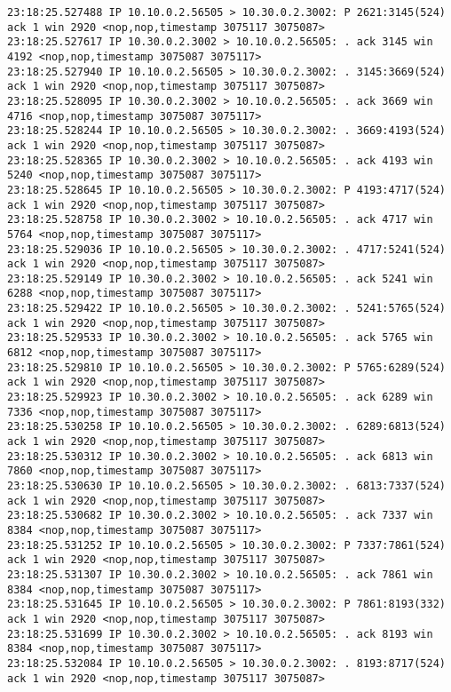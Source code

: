 \documentclass[a4paper,12pt]{article}
\begin{document}
\begin{Verbatim}
23:18:25.527488 IP 10.10.0.2.56505 > 10.30.0.2.3002: P 2621:3145(524) ack 1 win 2920 <nop,nop,timestamp 3075117 3075087>
23:18:25.527617 IP 10.30.0.2.3002 > 10.10.0.2.56505: . ack 3145 win 4192 <nop,nop,timestamp 3075087 3075117>
23:18:25.527940 IP 10.10.0.2.56505 > 10.30.0.2.3002: . 3145:3669(524) ack 1 win 2920 <nop,nop,timestamp 3075117 3075087>
23:18:25.528095 IP 10.30.0.2.3002 > 10.10.0.2.56505: . ack 3669 win 4716 <nop,nop,timestamp 3075087 3075117>
23:18:25.528244 IP 10.10.0.2.56505 > 10.30.0.2.3002: . 3669:4193(524) ack 1 win 2920 <nop,nop,timestamp 3075117 3075087>
23:18:25.528365 IP 10.30.0.2.3002 > 10.10.0.2.56505: . ack 4193 win 5240 <nop,nop,timestamp 3075087 3075117>
23:18:25.528645 IP 10.10.0.2.56505 > 10.30.0.2.3002: P 4193:4717(524) ack 1 win 2920 <nop,nop,timestamp 3075117 3075087>
23:18:25.528758 IP 10.30.0.2.3002 > 10.10.0.2.56505: . ack 4717 win 5764 <nop,nop,timestamp 3075087 3075117>
23:18:25.529036 IP 10.10.0.2.56505 > 10.30.0.2.3002: . 4717:5241(524) ack 1 win 2920 <nop,nop,timestamp 3075117 3075087>
23:18:25.529149 IP 10.30.0.2.3002 > 10.10.0.2.56505: . ack 5241 win 6288 <nop,nop,timestamp 3075087 3075117>
23:18:25.529422 IP 10.10.0.2.56505 > 10.30.0.2.3002: . 5241:5765(524) ack 1 win 2920 <nop,nop,timestamp 3075117 3075087>
23:18:25.529533 IP 10.30.0.2.3002 > 10.10.0.2.56505: . ack 5765 win 6812 <nop,nop,timestamp 3075087 3075117>
23:18:25.529810 IP 10.10.0.2.56505 > 10.30.0.2.3002: P 5765:6289(524) ack 1 win 2920 <nop,nop,timestamp 3075117 3075087>
23:18:25.529923 IP 10.30.0.2.3002 > 10.10.0.2.56505: . ack 6289 win 7336 <nop,nop,timestamp 3075087 3075117>
23:18:25.530258 IP 10.10.0.2.56505 > 10.30.0.2.3002: . 6289:6813(524) ack 1 win 2920 <nop,nop,timestamp 3075117 3075087>
23:18:25.530312 IP 10.30.0.2.3002 > 10.10.0.2.56505: . ack 6813 win 7860 <nop,nop,timestamp 3075087 3075117>
23:18:25.530630 IP 10.10.0.2.56505 > 10.30.0.2.3002: . 6813:7337(524) ack 1 win 2920 <nop,nop,timestamp 3075117 3075087>
23:18:25.530682 IP 10.30.0.2.3002 > 10.10.0.2.56505: . ack 7337 win 8384 <nop,nop,timestamp 3075087 3075117>
23:18:25.531252 IP 10.10.0.2.56505 > 10.30.0.2.3002: P 7337:7861(524) ack 1 win 2920 <nop,nop,timestamp 3075117 3075087>
23:18:25.531307 IP 10.30.0.2.3002 > 10.10.0.2.56505: . ack 7861 win 8384 <nop,nop,timestamp 3075087 3075117>
23:18:25.531645 IP 10.10.0.2.56505 > 10.30.0.2.3002: P 7861:8193(332) ack 1 win 2920 <nop,nop,timestamp 3075117 3075087>
23:18:25.531699 IP 10.30.0.2.3002 > 10.10.0.2.56505: . ack 8193 win 8384 <nop,nop,timestamp 3075087 3075117>
23:18:25.532084 IP 10.10.0.2.56505 > 10.30.0.2.3002: . 8193:8717(524) ack 1 win 2920 <nop,nop,timestamp 3075117 3075087>

\end{Verbatim}
\end{document}
